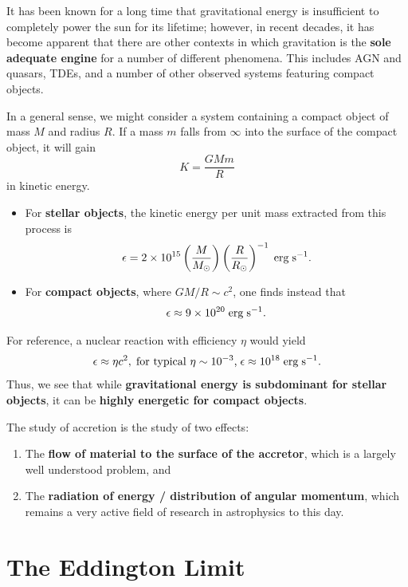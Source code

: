 It has been known for a long time that gravitational energy is insufficient to completely power the sun for its lifetime; however, in recent decades, it has become apparent that there are other contexts in which gravitation is the \textbf{sole adequate engine} for a number of different phenomena. This includes AGN and quasars, TDEs, and a number of other observed systems featuring compact objects.
\par
In a general sense, we might consider a system containing a compact object of mass $M$ and radius $R$. If a mass $m$ falls from $\infty$ into the surface of the compact object, it will gain
\[
K = \frac{GMm}{R}
\]
in kinetic energy.
\vspace{0.25cm}
\begin{itemize}
    \item For \textbf{stellar objects}, the kinetic energy per unit mass extracted from this process is
    \[
    \epsilon = 2 \times 10^{15}\left(\frac{M}{M_\odot}\right)\left(\frac{R}{R_\odot}\right)^{-1} \;{\rm erg\;s^{-1}}.
    \]
    \item For \textbf{compact objects}, where $GM/R \sim c^2$, one finds instead that
    \[
    \epsilon \approx 9\times 10^{20}\;{\rm erg\;s^{-1}}.
    \]
\end{itemize}
\vspace{0.25cm}
For reference, a nuclear reaction with efficiency $\eta$ would yield
\[
\epsilon \approx \eta c^2, \;\text{for typical $\eta \sim 10^{-3}$,}\; \epsilon \approx 10^{18}\;{\rm erg\; s^{-1}}.
\]
Thus, we see that while \textbf{gravitational energy is subdominant for stellar objects}, it can be \textbf{highly energetic for compact objects}.
\par

\begin{bigidea}
    The study of accretion is the study of two effects:
\begin{enumerate}
    \item The \textbf{flow of material to the surface of the accretor}, which is a largely well understood problem, and
    \item The \textbf{radiation of energy / distribution of angular momentum}, which remains a very active field of research in astrophysics to this day.
\end{enumerate}
\end{bigidea}

\section{The Eddington Limit}

